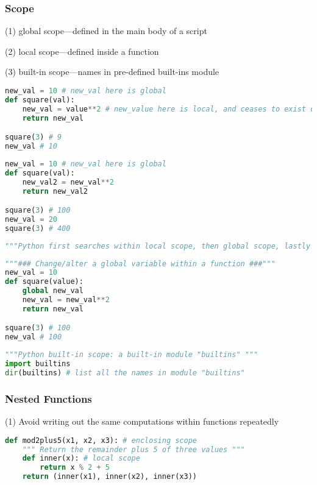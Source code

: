 \documentclass[12pt]{article}
\begin{document}
\subsubsection{\normalsize Scope}
\noindent
(1) global scope---defined in the main body of a script

\noindent
(2) local scope---defined inside a function

\noindent
(3) built-in scope---names in pre-defined built-ins module

\begin{lstlisting}[language=Python]
new_val = 10 # new_val here is global
def square(val):
    new_val = value**2 # new_value here is local, and ceases to exist outside the function
    return new_val

square(3) # 9
new_val # 10
\end{lstlisting}

\begin{lstlisting}[language=Python]
new_val = 10 # new_val here is global
def square(val):
    new_val2 = new_val**2
    return new_val2

square(3) # 100
new_val = 20
square(3) # 400
\end{lstlisting}

\begin{lstlisting}[language=Python]
"""Python first searches within local scope, then global scope, lastly built-in scope."""
\end{lstlisting}

\begin{lstlisting}[language=Python]
"""### Change/alter a global variable within a function ###"""
new_val = 10
def square(value):
    global new_val
    new_val = new_val**2
    return new_val

square(3) # 100
new_val # 100
\end{lstlisting}

\begin{lstlisting}[language=Python]
"""Python built-in scope: a built-in module "builtins" """
import builtins
dir(builtins) # list all the names in module "builtins"
\end{lstlisting}


\subsubsection{\normalsize Nested Functions}
(1) Avoid writing out the same computations within functions repeatedly
\begin{lstlisting}[language=Python]
def mod2plus5(x1, x2, x3): # enclosing scope
    """ Return the remainder plus 5 of three values """
    def inner(x): # local scope
        return x % 2 + 5
    return (inner(x1), inner(x2), inner(x3))
\end{lstlisting}
\end{document}
